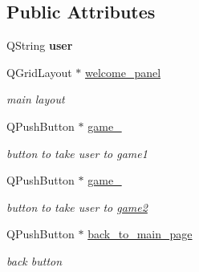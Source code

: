 \subsection*{Public Attributes}
\begin{DoxyCompactItemize}
\item 
\mbox{\label{classwelcome__screen_a8b21e1987457b57418388d0d8b68298b}} 
Q\+String {\bfseries user}
\item 
\mbox{\label{classwelcome__screen_a5f7e746d3e9d4a77d0db58f462ccd9ef}} 
Q\+Grid\+Layout $\ast$ \hyperlink{classwelcome__screen_a5f7e746d3e9d4a77d0db58f462ccd9ef}{welcome\+\_\+panel}
\begin{DoxyCompactList}\small\item\em main layout \end{DoxyCompactList}\item 
\mbox{\label{classwelcome__screen_ad3bc204c5c68e1c3ea8d04e3ae49dd53}} 
Q\+Push\+Button $\ast$ \hyperlink{classwelcome__screen_ad3bc204c5c68e1c3ea8d04e3ae49dd53}{game\+\_}
\begin{DoxyCompactList}\small\item\em button to take user to game1 \end{DoxyCompactList}\item 
\mbox{\label{classwelcome__screen_a7d375a26e024ea3edde7756493cf4749}} 
Q\+Push\+Button $\ast$ \hyperlink{classwelcome__screen_a7d375a26e024ea3edde7756493cf4749}{game\+\_}
\begin{DoxyCompactList}\small\item\em button to take user to \hyperlink{classgame2}{game2} \end{DoxyCompactList}\item 
\mbox{\label{classwelcome__screen_a60be3eb9f748b908354836ac74b66212}} 
Q\+Push\+Button $\ast$ \hyperlink{classwelcome__screen_a60be3eb9f748b908354836ac74b66212}{back\+\_\+to\+\_\+main\+\_\+page}
\begin{DoxyCompactList}\small\item\em back button \end{DoxyCompactList}\item 
\mbox{\label{classwelcome__screen_adac0cf08c52076b3c53d5b866ede9ce5}} 

\end{DoxyCompactItemize}
